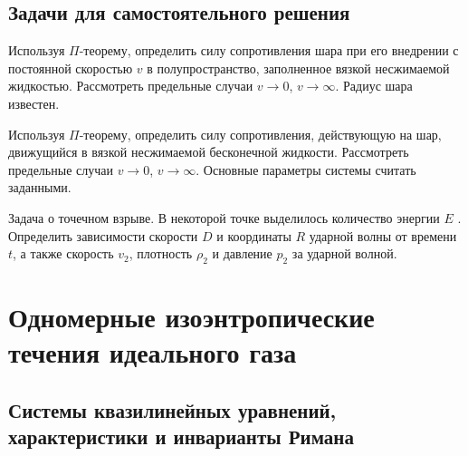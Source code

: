 \documentclass[a4paper, 14pt]{extarticle}
\begin{document}
\subsection{Задачи для самостоятельного решения}

\begin{problems}
	
	\item Используя $\Pi$-теорему, определить силу сопротивления шара при его внедрении с постоянной скоростью $v$ в полупространство, заполненное вязкой несжимаемой жидкостью. Рассмотреть предельные случаи $v \to 0$, $v \to \infty$. Радиус шара известен.
	
	\item
	Используя  $\Pi$-теорему, определить силу сопротивления, действующую на шар, движущийся в вязкой несжимаемой бесконечной жидкости. Рассмотреть предельные случаи $v \to 0$, $v \to \infty$. Основные параметры системы считать заданными.
	
	\item
	Задача о точечном взрыве. В некоторой точке выделилось количество энергии $E$ . Определить зависимости скорости $D$ и координаты $R$ ударной волны от времени $t$, а также скорость $v_2$, плотность $\rho_2$ и давление $p_2$ за ударной волной. 

\end{problems}

\section{Одномерные изоэнтропические течения идеального газа }

\subsection{Системы квазилинейных уравнений, характеристики и инварианты Римана}
\end{document}
